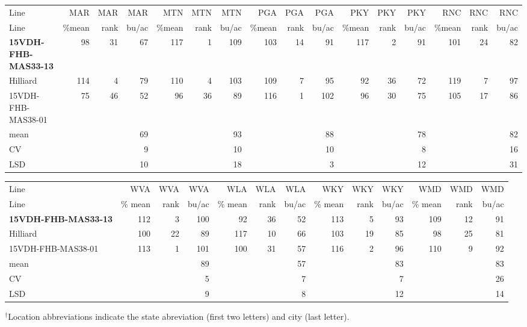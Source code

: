 \documentclass[12pt, letterpaper]{article}
\begin{document}
\begin{landscape}
\begin{table}
\bigskip

\begin{tabular}{|l|rrr|rrr|rrr|rrr|rrr|}
  \hline
Line & MAR & MAR & MAR & MTN & MTN & MTN & PGA & PGA & PGA & PKY & PKY & PKY & RNC & RNC & RNC \\ 
Line & \%mean & rank & bu/ac & \%mean & rank & bu/ac & \%mean & rank & bu/ac & \%mean & rank & bu/ac & \%mean & rank & bu/ac \\ 
  \hline
\textbf{15VDH-FHB-MAS33-13} &  98 &  31 &  67 & 117 &   1 & 109 & 103 &  14 &  91 & 117 &   2 &  91 & 101 &  24 &  82 \\ 
  Hilliard & 114 &   4 &  79 & 110 &   4 & 103 & 109 &   7 &  95 &  92 &  36 &  72 & 119 &   7 &  97 \\ 
  15VDH-FHB-MAS38-01 &  75 &  46 &  52 &  96 &  36 &  89 & 116 &   1 & 102 &  96 &  30 &  75 & 105 &  17 &  86 \\ 
  mean &  &  &  69 &  &  &  93 &  &  &  88 &  &  &  78 &  &  &  82 \\ 
  CV &  &  &   9 &  &  &  10 &  &  &  10 &  &  &   8 &  &  &  16 \\ 
  LSD &  &  &  10 &  &  &  18 &  &  &   3 &  &  &  12 &  &  &  31 \\ 
   \hline
\end{tabular}

\bigskip

\begin{tabular}{|l|rrr|rrr|rrr|rrr|}
  \hline
Line & WVA & WVA & WVA & WLA & WLA & WLA & WKY & WKY & WKY & WMD & WMD & WMD \\ 
Line & \% mean & rank & bu/ac & \% mean & rank & bu/ac & \% mean & rank & bu/ac & \% mean & rank & bu/ac \\ 
  \hline
\textbf{15VDH-FHB-MAS33-13} & 112 &   3 & 100 &  92 &  36 &  52 & 113 &   5 &  93 & 109 &  12 &  91 \\ 
  Hilliard & 100 &  22 &  89 & 117 &  10 &  66 & 103 &  19 &  85 &  98 &  25 &  81 \\ 
  15VDH-FHB-MAS38-01 & 113 &   1 & 101 & 100 &  31 &  57 & 116 &   2 &  96 & 110 &   9 &  92 \\ 
  mean &  &  &  89 &  &  &  57 &  &  &  83 &  &  &  83 \\ 
  CV &  &  &   5 &  &  &   7 &  &  &   7 &  &  &  26 \\ 
  LSD &  &  &   9 &  &  &   8 &  &  &  12 &  &  &  14 \\ 
   \hline
\end{tabular}

\raggedright{
\footnotesize
$^\dagger$Location abbreviations indicate the state abreviation (first two letters) and city (last letter).}
\end{table}




\end{landscape}
\end{document}
